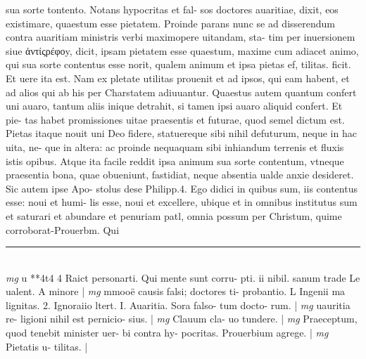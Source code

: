 \documentclass{article}
\begin{document}
\begin{pages}
sua sorte tontento. Notans hypocritas et fal- sos doctores auaritiae, dixit, eos existimare, quaestum esse pietatem. Proinde parans nunc se ad disserendum contra auaritiam ministris verbi maximopere uitandam, sta- tim per inuersionem siue ἀντίςρέφοy, dicit, ipsam pietatem esse quaestum, maxime cum adiacet animo, qui sua sorte contentus esse norit, qualem animum et ipsa pietas ef, tilitas. ficit. Et uere ita est. Nam ex pletate utilitas prouenit et ad ipsos, qui eam habent, et ad alios qui ab his per Charstatem adiuuantur. Quaestus autem quantum confert uni auaro, tantum aliis inique detrahit, si tamen ipsi auaro aliquid confert. Et pie- tas habet promissiones uitae praesentis et futurae, quod semel dictum est. Pietas itaque nouit uni Deo fidere, statuereque sibi nihil defuturum, neque in hac uita, ne- que in altera: ac proinde nequaquam sibi inhiandum terrenis et fluxis istis opibus. Atque ita facile reddit ipsa animum sua sorte contentum, vtneque praesentia bona, quae obueniunt, fastidiat, neque absentia ualde anxie desideret. Sic autem ipse Apo- stolus dese Philipp.4. Ego didici in quibus sum, iis contentus esse: noui et humi- lis esse, noui et excellere, ubique et in omnibus institutus sum et saturari et abundare et penuriam patl, omnia possum per Christum, quime corroborat-Prouerbm. Qui  \pend
\vspace{0.5cm}\noindent
\vspace{0.2cm}\rule{1cm}{0.2pt}\\ 
\hspace{0.2cm}\textit{mg}
\footnotesize u **4t4 4 Raict personarti. Qui mente sunt corru- pti. ii nibil. sanum trade Le ualent. A minore 
\normalsize| 
\hspace{0.2cm}\textit{mg}
\footnotesize mmooë causis falsi; doctores ti- probantio. L Ingenii ma lignitas. 2. Ignoraiio ltert. I. Auaritia. Sora falso- tum docto- rum. 
\normalsize| 
\hspace{0.2cm}\textit{mg}
\footnotesize uauritia re- ligioni nihil est pernicio- sius. 
\normalsize| 
\hspace{0.2cm}\textit{mg}
\footnotesize Clauum cla- uo tundere. 
\normalsize| 
\hspace{0.2cm}\textit{mg}
\footnotesize Praeceptum, quod tenebit minister uer- bi contra hy- pocritas. Prouerbium agrege. 
\normalsize| 
\hspace{0.2cm}\textit{mg}
\footnotesize Pietatis u- tilitas. 
\normalsize| 

\end{pages}
\end{document}

